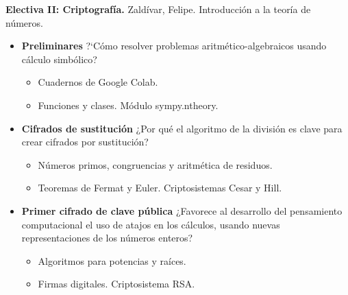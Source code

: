 \documentclass[aspectratio=169]{beamer}
\begin{document}
\begin{frame}
\textbf{Electiva II: {\green Criptograf\'ia.}} Zald\'ivar, Felipe. Introducci\'on a la teor\'ia de n\'umeros. \\ \pause

\begin{itemize}

  \item \textbf{{\green Preliminares}\)} ?`C\'omo resolver problemas aritm\'etico-algebraicos 
  usando c\'alculo simb\'olico? \pause
    \begin{itemize}
        \item Cuadernos de Google Colab. 
        \item Funciones y clases. Módulo sympy.ntheory. \pause
    \end{itemize} 

  \item \textbf{{\green Cifrados de sustituci\'on}} ¿Por qu\'e el algoritmo de la divisi\'on 
  es clave para crear cifrados por sustituci\'on? \pause
      \begin{itemize} 
        \item N\'umeros primos, congruencias y aritm\'etica de residuos. 
        \item Teoremas de Fermat y Euler. Criptosistemas Cesar y Hill. \pause
      \end{itemize} 

  \item \textbf{{\green Primer cifrado de clave p\'ublica}} ¿Favorece al desarrollo del pensamiento computacional el uso
  de atajos en los c\'alculos, usando nuevas representaciones de los n\'umeros enteros? \pause
      \begin{itemize}
        \item Algoritmos para potencias y ra\'ices.
        \item Firmas digitales. Criptosistema RSA. \pause
      \end{itemize}

    \end{itemize}
\end{frame}
\end{document}
